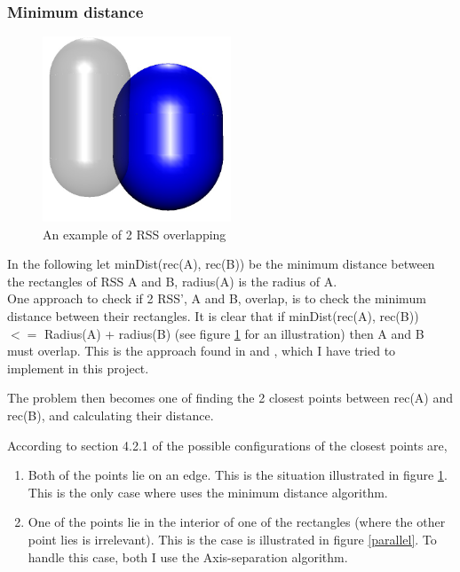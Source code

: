 \subsubsection{Minimum distance}

\begin{figure}
\centering
\includegraphics[width=0.5\textwidth]{figures/normalInter}
\caption{\label{normal-inter}An example of 2 RSS overlapping}
\end{figure}

In the following let minDist(rec(A), rec(B)) be the minimum distance between the rectangles of RSS A and B, radius(A) is the radius of A.\\

One approach to check if 2 RSS', A and B, overlap, is to check the minimum distance between their rectangles. It is clear that if minDist(rec(A), rec(B)) $<=$ Radius(A) + radius(B)  (see figure \ref{normal-inter} for an illustration) then A and B must overlap. This is the approach found in \cite{Larsen99fastproximity} and \cite{larsen00fast}, which I have tried to implement in this project.

The problem then becomes one of finding the 2 closest points between rec(A) and rec(B), and calculating their distance.

According to section 4.2.1 of \cite{Larsen99fastproximity} the possible configurations of the closest points are, 
\begin{enumerate}
\item Both of the points lie on an edge. This is the situation illustrated in figure \ref{normal-inter}. This is the only case where \cite{Larsen99fastproximity} uses the minimum distance algorithm.
\item One of the points lie in the interior of one of the rectangles (where the other point lies is irrelevant). This is the case is illustrated in figure \ref{parallel}. To handle this case, both I use the Axis-separation algorithm. 
\end{enumerate}

